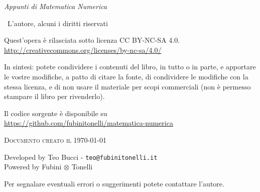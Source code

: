 
{\Large \textit{Appunti di Matematica Numerica}}


\textcopyright \ L'autore, alcuni i diritti riservati

Quest'opera è rilasciata sotto licenza CC BY-NC-SA 4.0.\\
\url{http://creativecommons.org/licenses/by-nc-sa/4.0/}

In sintesi: potete condividere i contenuti del libro, in tutto o in parte, e apportare le vostre modifiche, a patto di citare la fonte, di condividere le modifiche con la stessa licenza, e di non usare il materiale per scopi commerciali (non è permesso stampare il libro per rivenderlo).


Il codice sorgente \latex è disponibile su \\
\url{https://github.com/fubinitonelli/matematica-numerica}

\textsc{Documento creato il \today}

Developed by Teo Bucci - \texttt{teo@fubinitonelli.it}\\
Powered by Fubini $\otimes$ Tonelli

Per segnalare eventuali errori o suggerimenti potete contattare l'autore.